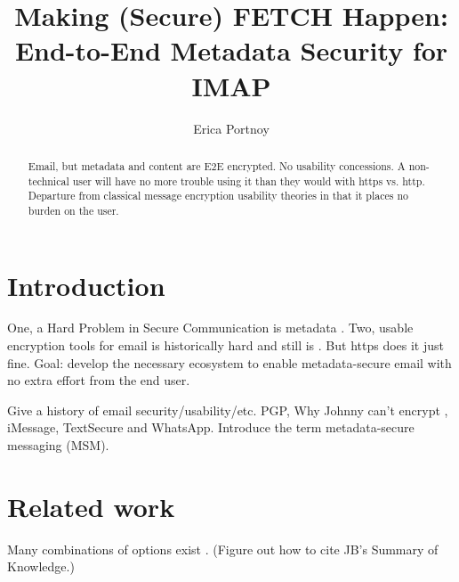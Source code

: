 \documentclass[pageno]{jpaper}
\newcommand{\project}{IMAPSec }
\begin{document}
\title{Making (Secure) FETCH Happen:
\\ \vspace{2 mm} {\large End-to-End Metadata Security for IMAP}}


\author{Erica Portnoy}

\date{}
\maketitle

\thispagestyle{empty}

\tableofcontents

\begin{abstract}
Email, but metadata and content are E2E encrypted. No usability concessions. A non-technical user will have no more trouble using it than they would with https vs. http. Departure from classical message encryption usability theories in that it places no burden on the user.
\end{abstract}

\section{Introduction}

One, a Hard Problem in Secure Communication is metadata \cite{hardprob}. Two, usable encryption tools for email is historically hard and still is \cite{johnny}. But https does it just fine. Goal: develop the necessary ecosystem to enable metadata-secure email with no extra effort from the end user.

Give a history of email security/usability/etc. PGP, Why Johnny can't encrypt \cite{johnny}, iMessage, TextSecure and WhatsApp. Introduce the term metadata-secure messaging (MSM).

\section{Related work}
Many combinations of options exist \cite{spreadsheet}. (Figure out how to cite JB's Summary of Knowledge.)
\end{document}
